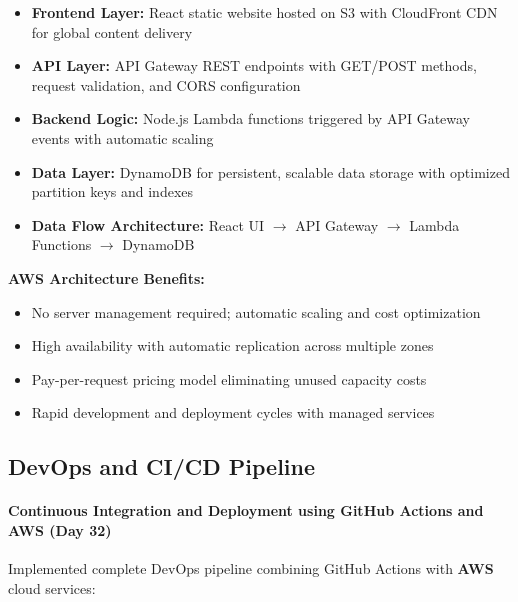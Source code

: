 \begin{itemize}
    \item \textbf{Frontend Layer:} React static website hosted on S3 with CloudFront CDN for global content delivery
    \item \textbf{API Layer:} API Gateway REST endpoints with GET/POST methods, request validation, and CORS configuration
    \item \textbf{Backend Logic:} Node.js Lambda functions triggered by API Gateway events with automatic scaling
    \item \textbf{Data Layer:} DynamoDB for persistent, scalable data storage with optimized partition keys and indexes
    \item \textbf{Data Flow Architecture:} React UI $\rightarrow$ API Gateway $\rightarrow$ Lambda Functions $\rightarrow$ DynamoDB
\end{itemize}

\textbf{\textbf{AWS} Architecture Benefits:}
\begin{itemize}
    \item No server management required; automatic scaling and cost optimization
    \item High availability with automatic replication across multiple zones
    \item Pay-per-request pricing model eliminating unused capacity costs
    \item Rapid development and deployment cycles with managed services
\end{itemize}

\subsection{DevOps and CI/CD Pipeline}

\paragraph{Continuous Integration and Deployment using GitHub Actions and AWS (Day 32)}

Implemented complete DevOps pipeline combining GitHub Actions with \textbf{AWS} cloud services:

